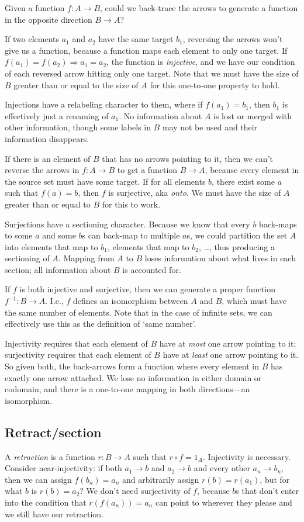 \documentclass[11pt]{article}
\begin{document}
Given a function $f:A\to B$, could we back-trace the arrows to generate a function in the opposite direction $B\to A$?

If two elements $a_1$ and $a_2$ have the same target $b_1$, reversing the arrows
won't give us a function, because a function maps each element to only one target.
If $f(a_1)=f(a_2) \Rightarrow a_1=a_2$, the function is {\em injective}, and we have our
condition of each reversed arrow hitting only one target. Note that we must have the size
of $B$ greater than or equal to the size of $A$ for this one-to-one property to hold.

Injections have a relabeling character to them, where if $f(a_1)=b_1$, then $b_1$ is
effectively just a renaming of $a_1$. No information about $A$ is lost or merged with
other information, though some labels in $B$ may not be used and their information
disappears.

If there is an element of $B$ that has no arrows pointing to it, then we can't reverse the
arrows in $f:A\to B$ to get a function $B\to A$, because every element in the source set
must have some target. If for all elements $b$, there exist some $a$ such that $f(a)=b$,
then $f$ is surjective, aka {\em onto}. We must have the size of $A$ greater than or equal
to $B$ for this to work.

Surjections have a sectioning character.  Because we know that every $b$ back-maps to some $a$ and some $b$s
can back-map to multiple $a$s, we could partition the set $A$ into elements that map to $b_1$,
elements that map to $b_2$, \dots, thus producing a sectioning of $A$. Mapping from $A$ to
$B$ loses information about what lives in each section; all information about $B$ is
accounted for.

If $f$ is both injective and surjective, then we can generate a proper function
$f^{-1}:B\to A$. I.e., $f$ defines an isomorphism between $A$ and $B$, which must have
the same number of elements. Note that in the case of infinite sets, we can effectively
use this as the definition of `same number'.

Injectivity requires that each element of $B$ have at {\em most} one arrow pointing
to it; surjectivity requires that each element of $B$ have at {\em least} one arrow
pointing to it.  So given both, the back-arrows form a function where every element in
$B$ has exactly one arrow attached. We lose no information in either domain or codomain,
and there is a one-to-one mapping in both directions---an isomorphism.

\subsection{Retract/section}
A {\em retraction} is a function $r:B\to A$ such that $r\circ f=1_A$. Injectivity is
necessary. Consider near-injectivity: if both $a_1\to b$ and $a_2\to b$ and every other
$a_n\to b_n$, then we can assign $f(b_n)=a_n$ and arbitrarily assign $r(b)=r(a_1)$,
but for what $b$ is $r(b)=a_2$?  We don't need surjectivity of $f$, because $b$s that
don't enter into the condition that $r(f(a_n))=a_n$ can point to wherever they please
and we still have our retraction.
\end{document}
